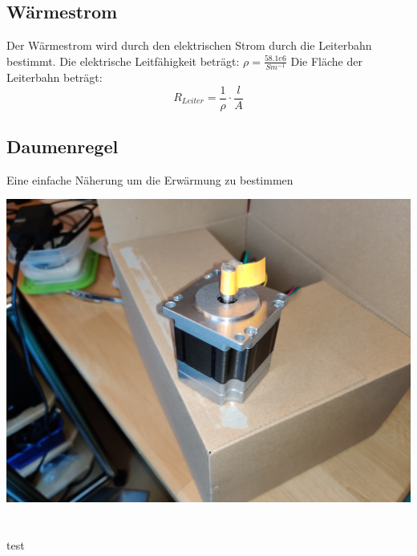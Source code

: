 \documentclass[10pt,a4paper,oneside,abstracton]{scrartcl}
\newenvironment{Figure}
  {\par\medskip\noindent\minipage{\linewidth}}
  {\endminipage\par\medskip}
\begin{document}
\begin{multicols}{2}
\subsection*{Wärmestrom}
Der Wärmestrom wird durch den elektrischen Strom durch die Leiterbahn bestimmt. 
\newline
Die elektrische Leitfähigkeit beträgt:  $ \rho = \frac{58.1e6}{Sm^{-1}} $
Die Fläche der Leiterbahn beträgt: 
\begin{equation}
	R_{Leiter} = \frac{1}{\rho} \cdot \frac{l}{A}
\end{equation}

\subsection*{Daumenregel}
Eine einfache Näherung um die Erwärmung zu bestimmen




\begin{Figure}
	\includegraphics[width=\textwidth]{Bilder/BLDCMotor.jpg}
\end{Figure}

\section{}

test


\end{multicols}
\end{document}
